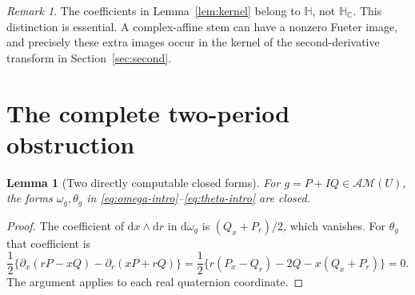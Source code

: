 \documentclass[11pt,a4paper]{article}
\numberwithin{equation}{section}
\newtheorem{lemma}[theorem]{Lemma}
\theoremstyle{definition}
\theoremstyle{remark}
\newtheorem{remark}[theorem]{Remark}
\newcommand{\C}{\mathbb C}
\newcommand{\HH}{\mathbb H}
\newcommand{\HC}{\mathbb H_{\C}}
\newcommand{\AM}{\mathcal{AM}}
\begin{document}
\begin{remark}
The coefficients in Lemma~\ref{lem:kernel} belong to $\HH$, not $\HC$.
This distinction is essential. A complex-affine stem can have a nonzero
Fueter image, and precisely these extra images occur in the kernel of
the second-derivative transform in Section~\ref{sec:second}.
\end{remark}

\section{The complete two-period obstruction}
\label{sec:period}

\begin{lemma}[Two directly computable closed forms]\label{lem:closed}
For $g=P+IQ\in\AM(U)$, the forms $\omega_g,\theta_g$ in
\eqref{eq:omega-intro}--\eqref{eq:theta-intro} are closed.
\end{lemma}
\begin{proof}
The coefficient of $\mathrm dx\wedge\mathrm dr$ in $\mathrm d\omega_g$
is $(Q_x+P_r)/2$, which vanishes. For $\theta_g$ that coefficient is
\[
 \frac12\{\partial_x(rP-xQ)-\partial_r(xP+rQ)\}
 =\frac12\{r(P_x-Q_r)-2Q-x(Q_x+P_r)\}=0.
\]
The argument applies to each real quaternion coordinate.
\end{proof}
\end{document}
